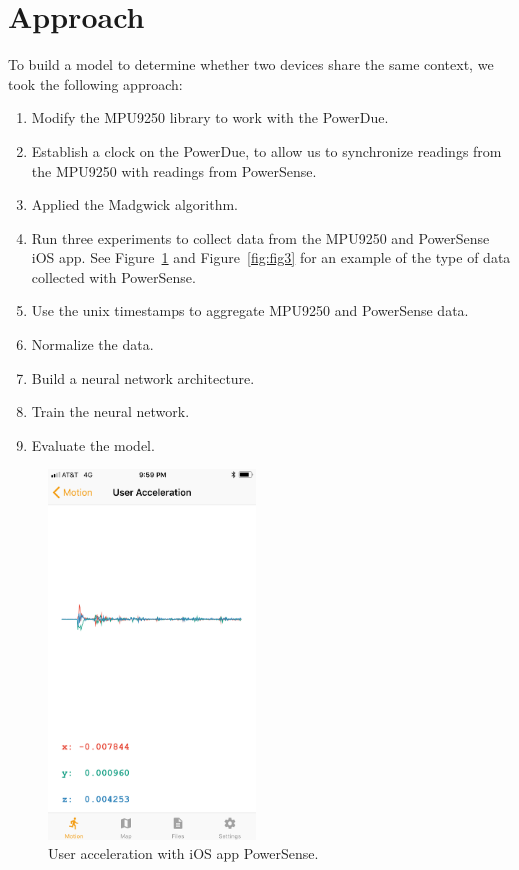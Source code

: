 \documentclass[journal]{IEEEtranTIE}
\begin{document}
\section{Approach}

To build a model to determine whether two devices share the same context, we
took the following approach:

\begin{enumerate}
\item Modify the MPU9250 library to work with the PowerDue.
\item Establish a clock on the PowerDue, to allow us to synchronize readings
      from the MPU9250 with readings from PowerSense.
\item Applied the Madgwick algorithm.
\item Run three experiments to collect data from the MPU9250 and PowerSense iOS
      app. See Figure~\ref{fig:fig2} and Figure~\ref{fig:fig3} for an example of
      the type of data collected with PowerSense.
\item Use the unix timestamps to aggregate MPU9250 and PowerSense data.
\item Normalize the data.
\item Build a neural network architecture.
\item Train the neural network.
\item Evaluate the model.
\end{enumerate}

\begin{figure}[!t]\centering
	\includegraphics[width=5.5cm]{acceleration}
	\caption{User acceleration with iOS app PowerSense.}\label{fig:fig2}
\end{figure}
\end{document}
